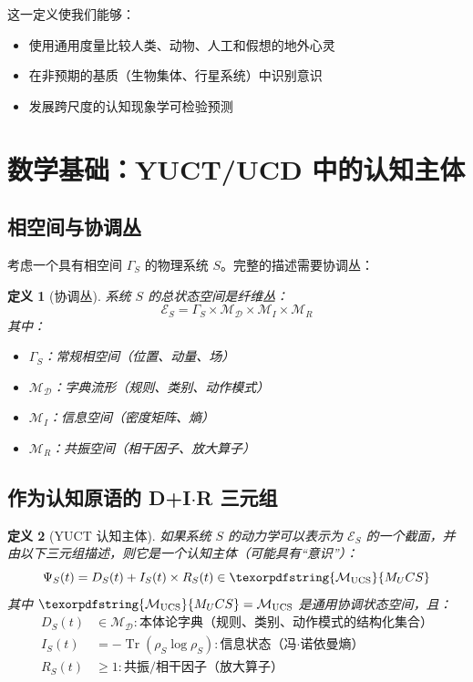 \documentclass[11pt,a4paper]{article}
\newtheorem{definition}{定义}
\DeclareMathOperator{\Tr}{Tr}
\DeclareRobustCommand{\UCS}{\texorpdfstring{\ensuremath{\mathcal{M}_{\mathrm{UCS}}}}{M_UCS}}
\newcommand{\Dict}{\mathcal{D}}
\newcommand{\Mdict}{\mathcal{M}_{\Dict}}
\begin{document}
	这一定义使我们能够：
	\begin{itemize}
		\item 使用通用度量比较人类、动物、人工和假想的地外心灵
		\item 在非预期的基质（生物集体、行星系统）中识别意识
		\item 发展跨尺度的认知现象学可检验预测
	\end{itemize}
	
	\section{数学基础：YUCT/UCD 中的认知主体}
	
	\subsection{相空间与协调丛}
	
	考虑一个具有相空间 \(\Gamma_S\) 的物理系统 \(S\)。完整的描述需要协调丛：
	
	\begin{definition}[协调丛]
		系统 \(S\) 的总状态空间是纤维丛：
		\[
		\mathcal{E}_S = \Gamma_S \times \Mdict \times \mathcal{M}_I \times \mathcal{M}_R
		\]
		其中：
		\begin{itemize}
			\item \(\Gamma_S\)：常规相空间（位置、动量、场）
			\item \(\Mdict\)：字典流形（规则、类别、动作模式）
			\item \(\mathcal{M}_I\)：信息空间（密度矩阵、熵）
			\item \(\mathcal{M}_R\)：共振空间（相干因子、放大算子）
		\end{itemize}
	\end{definition}
	
	\subsection{作为认知原语的 D+I\(\cdot\)R 三元组}
	
	\begin{definition}[YUCT 认知主体]
		如果系统 \(S\) 的动力学可以表示为 \(\mathcal{E}_S\) 的一个截面，并由以下三元组描述，则它是一个认知主体（可能具有“意识”）：
		\begin{equation}
			\label{eq:dir-triad}
			\Psi_S(t) = D_S(t) + I_S(t) \times R_S(t) \in \UCS
		\end{equation}
		其中 \(\UCS = \mathcal{M}_{\mathrm{UCS}}\) 是通用协调状态空间，且：
		\begin{align*}
			D_S(t) &\in \Mdict: \text{本体论字典（规则、类别、动作模式的结构化集合）} \\
			I_S(t) &= -\Tr(\rho_S \log \rho_S): \text{信息状态（冯·诺依曼熵）} \\
			R_S(t) &\geq 1: \text{共振/相干因子（放大算子）}
		\end{align*}
	\end{definition}
	
\end{document}
